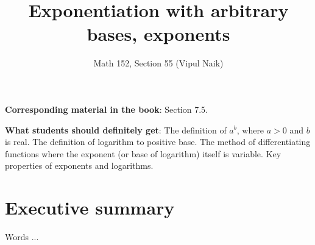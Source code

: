 \documentclass[10pt]{amsart}
\title{Exponentiation with arbitrary bases, exponents}
\author{Math 152, Section 55 (Vipul Naik)}
\begin{document}
\maketitle

{\bf Corresponding material in the book}: Section 7.5.

{\bf What students should definitely get}: The definition of $a^b$,
where $a > 0$ and $b$ is real. The definition of logarithm to positive
base. The method of differentiating functions where the exponent (or
base of logarithm) itself is variable. Key properties of exponents and
logarithms.

\section*{Executive summary}

Words ...
\end{document}
